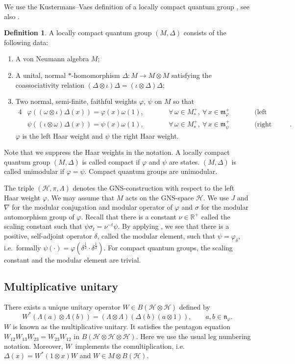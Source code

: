 \documentclass[11pt]{article}
\numberwithin{equation}{section}
\theoremstyle{definition}
\newtheorem{dfn}[thm]{Definition}
\newcommand{\cHil}{\mathcal{H}}
\newcommand{\nphi}{\mathfrak{n}_\varphi}
\begin{document}
 We use the Kustermans--Vaes def\/inition of a locally compact quantum group \cite{KusVae,KusVaeII}, see also \cite{KusLec,Tim,DaeleLcqg}.
\begin{dfn}
A locally compact quantum group $(M, \Delta)$ consists of the
following data:
\begin{enumerate}\itemsep=0pt
 \item A von Neumann algebra $M$;
\item A unital, normal $\ast$-homomorphism $\Delta: M \rightarrow M \otimes M$ satisfying the coassociativity relation $(\Delta \otimes \iota) \Delta = (\iota \otimes \Delta) \Delta$;
\item  Two  normal, semi-f\/inite, faithful weights
$\varphi$, $\psi$ on $M$ so that
\begin{alignat*}{4}
& \varphi \left( (\omega \otimes \iota )\Delta(x)\right)=
\varphi(x)\omega(1), \qquad && \forall \, \omega \in M^+_*,\  \forall\,
x\in \mathfrak{m}^+_\varphi
\qquad && \text{(left invariance);}& \\
& \psi\left( (\iota \otimes\omega)\Delta(x)\right)=
\psi(x)\omega(1), \qquad && \forall \, \omega \in M^+_*,\ \forall\,
x\in \mathfrak{m}^+_\psi \qquad && \text{(right invariance)}. &
\end{alignat*}
$\varphi$ is the left Haar weight and $\psi$ the right Haar
weight.
\end{enumerate}
\end{dfn}
\noindent Note that we suppress the Haar weights in the notation. A locally compact quantum group $(M, \Delta)$ is called compact if $\varphi$ and $\psi$ are states. $(M, \Delta)$ is called unimodular if $\varphi = \psi$. Compact quantum groups are unimodular.

 The triple $(\cHil, \pi,
\Lambda)$ denotes the GNS-construction with respect to the left
Haar weight $\varphi$. We may assume that $M$ acts on the
GNS-space $\cHil$. We use $J$ and $\nabla$ for the modular conjugation and modular operator of $\varphi$ and $\sigma$ for the modular automorphism group of $\varphi$. Recall that there is a constant $\nu \in \mathbb{R}^+$ called the scaling constant such that $\psi \sigma_t = \nu^{-t} \psi$. By applying \cite{VaeRad}, we see that there is a positive, self-adjoint operator $\delta$, called the modular element, such that $\psi = \varphi_\delta$, i.e.\ formally $\psi(\cdot) = \varphi(\delta^{\frac{1}{2}} \cdot \delta^{\frac{1}{2}} )$. For compact quantum groups, the scaling constant and the modular element are trivial.

\subsection*{Multiplicative unitary}
There exists a unique unitary operator $W\in
B(\cHil \otimes \cHil)$ def\/ined by
\[
W^\ast \left( \Lambda (a)\otimes  \Lambda(b) \right) = \left(
\Lambda \otimes \Lambda \right) \left( \Delta (b)(a\otimes
1)\right), \qquad a,b \in \nphi.
\]
$W$ is known as the multiplicative unitary. It satisf\/ies the
pentagon equation $W_{12}W_{13}W_{23}=W_{23}W_{12}$ in $B(\cHil
\otimes \cHil \otimes \cHil)$. Here we use the usual leg numbering notation. Moreover, $W$~implements the comultiplication, i.e.\ $\Delta(x) = W^\ast (1 \otimes x) W$ and $W \in M \otimes B(\cHil)$.
\end{document}
